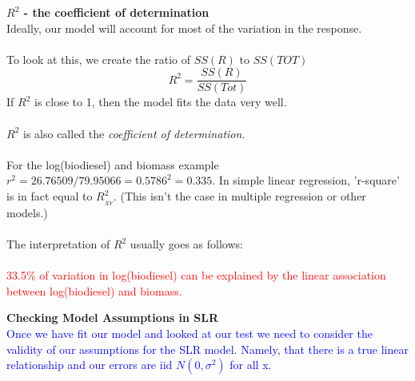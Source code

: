 \newpage

\Large\textbf{$R^2$ - the coefficient of determination}\large\\

Ideally, our model will account for most of the variation in the response.\\~\\

To look at this, we create the ratio of $SS(R)$ to $SS(TOT)$ 
$$R^2=\frac{SS(R)}{SS(Tot)}$$
If $R^2$ is close to 1, then the model fits the data very well.\\~\\

$R^2$ is also called the {\em coefficient of determination}.  \\~\\

For the log(biodiesel) and biomass example $r^2=26.76509/79.95066=0.5786^2= 0.335$.  In simple linear regression, 'r-square' is in fact equal to $R_{_{XY}}^2$.  (This isn't the case in multiple regression or other models.)\\~\\

The interpretation of $R^2$ usually goes as follows:\\~\\

\textcolor{red}{33.5\% of variation in log(biodiesel) can be explained by the linear association between log(biodiesel) and biomass.}

\newpage



\Large \textbf{Checking Model Assumptions in SLR}\large\\

\textcolor{blue}{Once we have fit our model and looked at our test we need to consider the validity of our assumptions for the SLR model.  Namely, that there is a true linear relationship and our errors are iid $N(0,\sigma^2)$ for all x.}\\~\\

